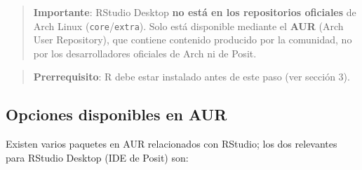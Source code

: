 \documentclass[
  man,
  floatsintext,
  longtable,
  a4paper,
  nolmodern,
  notxfonts,
  notimes,
  12pt,
  colorlinks=true,linkcolor=blue,citecolor=blue,urlcolor=blue]{apa7}
\begin{document}
\begin{quote}
\textbf{Importante}: RStudio Desktop \textbf{no está en los repositorios
oficiales} de Arch Linux (\texttt{core}/\texttt{extra}). Solo está
disponible mediante el \textbf{AUR} (Arch User Repository), que contiene
contenido producido por la comunidad, no por los desarrolladores
oficiales de Arch ni de Posit.
\end{quote}

\begin{quote}
\textbf{Prerrequisito}: R debe estar instalado antes de este paso (ver
sección 3).
\end{quote}

\subsection{Opciones disponibles en
AUR}\label{opciones-disponibles-en-aur}

Existen varios paquetes en AUR relacionados con RStudio; los dos
relevantes para RStudio Desktop (IDE de Posit) son:
\end{document}
